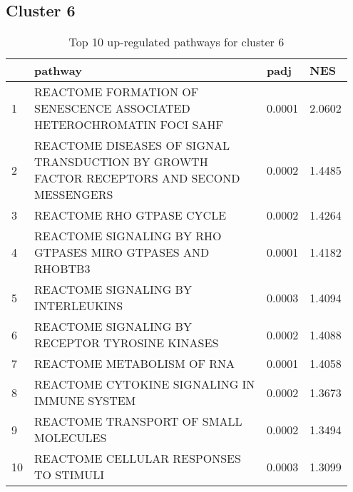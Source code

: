\documentclass{article}
\begin{document}
\subsection{Cluster 6 }
\begin{table}[H]
\centering
\begin{tabular}{p{0.05\linewidth}p{0.7\linewidth}p{0.1\linewidth}p{0.1\linewidth}}
  \hline
 & pathway & padj & NES \\ 
  \hline
1 & REACTOME FORMATION OF SENESCENCE ASSOCIATED HETEROCHROMATIN FOCI SAHF & 0.0001 & 2.0602 \\ 
  2 & REACTOME DISEASES OF SIGNAL TRANSDUCTION BY GROWTH FACTOR RECEPTORS AND SECOND MESSENGERS & 0.0002 & 1.4485 \\ 
  3 & REACTOME RHO GTPASE CYCLE & 0.0002 & 1.4264 \\ 
  4 & REACTOME SIGNALING BY RHO GTPASES MIRO GTPASES AND RHOBTB3 & 0.0001 & 1.4182 \\ 
  5 & REACTOME SIGNALING BY INTERLEUKINS & 0.0003 & 1.4094 \\ 
  6 & REACTOME SIGNALING BY RECEPTOR TYROSINE KINASES & 0.0002 & 1.4088 \\ 
  7 & REACTOME METABOLISM OF RNA & 0.0001 & 1.4058 \\ 
  8 & REACTOME CYTOKINE SIGNALING IN IMMUNE SYSTEM & 0.0002 & 1.3673 \\ 
  9 & REACTOME TRANSPORT OF SMALL MOLECULES & 0.0002 & 1.3494 \\ 
  10 & REACTOME CELLULAR RESPONSES TO STIMULI & 0.0003 & 1.3099 \\ 
   \hline
\end{tabular}
\caption{Top 10 up-regulated pathways for cluster 6} 
\label{tab:q3_2_6}
\end{table}
\end{document}
